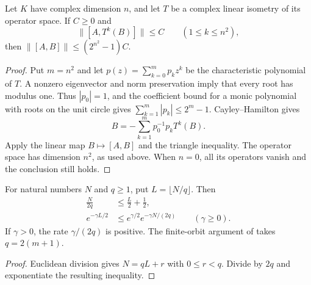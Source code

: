 \begin{lemma}
    \label{thm:hastings_finite_translation_commutator}
    \leanok
    Let $K$ have complex dimension $n$, and let $T$ be a complex linear
    isometry of its operator space. If $C\ge0$ and
    \[
        \|[A,T^k(B)]\|\le C\qquad(1\le k\le n^2),
    \]
    then $\|[A,B]\|\le(2^{n^2}-1)C$.
\end{lemma}
\begin{proof}\leanok
    Put $m=n^2$ and let $p(z)=\sum_{k=0}^m p_kz^k$ be the
    characteristic polynomial of $T$. A nonzero eigenvector and norm
    preservation imply that every root has modulus one. Thus
    $|p_0|=1$, and the coefficient bound for a monic polynomial with
    roots on the unit circle gives
    $\sum_{k=1}^m|p_k|\le2^m-1$.
    Cayley--Hamilton gives
    \[
        B=-\sum_{k=1}^m p_0^{-1}p_k T^k(B).
    \]
    Apply the linear map $B\mapsto[A,B]$ and the triangle inequality.
    The operator space has dimension $n^2$, as used above. When
    $n=0$, all its operators vanish and the conclusion still holds.
\end{proof}

\begin{lemma}
    \label{lem:hastings_translation_floor_decay}
    \leanok
    For natural numbers $N$ and $q\ge1$, put $L=\lfloor N/q\rfloor$.
    Then
    \begin{align}
        \frac{N}{2q} & \le\frac L2+\frac12, \\
        e^{-\gamma L/2}  & \le e^{\gamma/2}
        e^{-\gamma N/(2q)}\qquad(\gamma\ge0).
        \label{eq:hastings_translation_floor_decay}
    \end{align}
    If $\gamma>0$, the rate $\gamma/(2q)$ is positive. The finite-orbit
    argument of \cite[lines 1644--1654]{Hastings2006Solving} takes $q=2(m+1)$.
\end{lemma}
\begin{proof}\leanok
    Euclidean division gives $N=qL+r$ with $0\le r<q$.
    Divide by $2q$ and exponentiate the resulting inequality.
\end{proof}

